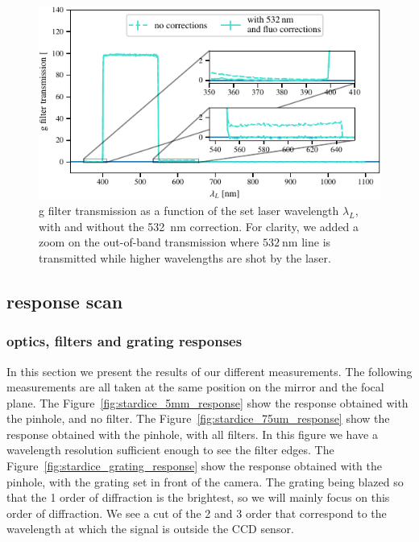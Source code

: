 \begin{figure}[h]
    \centering
    \includegraphics[width=\columnwidth]{fig/g_filter_532.pdf}
    \caption{\SD g filter transmission as a function of the set laser wavelength $\lambda_L$, with and without the \SI{532}{\nm} correction. For clarity, we added a zoom on the out-of-band transmission where $\SI{532}{\nm}$ line is transmitted while higher wavelengths are shot by the laser.}
    \label{fig:g_filter_532}
\end{figure}

\subsection{\SD response scan}

\subsubsection{\SD optics, filters and grating responses}

In this section we present the results of our different measurements. The following measurements are all taken at the same position on the mirror and the focal plane. The Figure~\ref{fig:stardice_5mm_response} show the \SD response obtained with the \bpinhole pinhole, and no filter. The Figure~\ref{fig:stardice_75um_response} show the \SD response obtained with the \spinhole pinhole, with all filters. In this figure we have a wavelength resolution sufficient enough to see the filter edges. The Figure~\ref{fig:stardice_grating_response} show the \SD response obtained with the \spinhole pinhole, with the grating set in front of the camera. The grating being blazed so that the 1 order of diffraction is the brightest, so we will mainly focus on this order of diffraction. We see a cut of the 2 and 3 order that correspond to the wavelength at which the signal is outside the CCD sensor.

